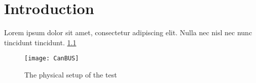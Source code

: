 \graphicspath{{chapters/01Introduction/figures}}
\chapter{Introduction}\label{ch:introduction}
Lorem ipsum dolor sit amet, consectetur adipiscing elit.
Nulla nec nisl nec nunc tincidunt tincidunt. \ref{fig:can}
\begin{figure}[H]
    \centering
    \texttt{[image: CanBUS]}
    \caption{The physical setup of the test}
    \label{fig:can}
\end{figure}